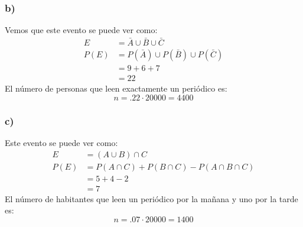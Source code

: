 \documentclass{article}
\begin{document}
\begin{tcolorbox}[breakable]
    \subsubsection*{b)}
    Vemos que este evento se puede ver como:
    \begin{align*}
        E &= \bar{A} \cup \bar{B} \cup \bar{C} \\
        P(E) &= P(\bar{A}) \cup P(\bar{B}) \cup P(\bar{C}) \\
        &= 9 + 6 + 7 \\
        &= 22
    \end{align*}
    El número de personas que leen exactamente un periódico es:
    \[ n = .22 \cdot 20000 = 4400 \]
    
    \subsubsection*{c)}
    Este evento se puede ver como:
    \begin{align*}
        E &= (A \cup B) \cap C \\
        P(E) &= P(A \cap C) + P(B \cap C) - P(A \cap B \cap C) \\
        &= 5 + 4 - 2 \\
        &= 7
    \end{align*}
    El número de habitantes que leen un periódico por la mañana y uno por la tarde es:
    \[ n = .07 \cdot 20000 = 1400 \]

\end{tcolorbox}
\end{document}
